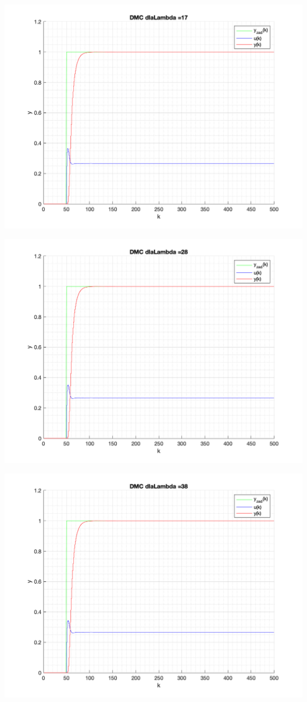 \documentclass[a4paper, 11pt]{article}
\begin{document}
\begin{enumerate}
 \includegraphics[width=\linewidth]{./ModelsP4_Lambda/P4_DMC_Lambda_17_png.png} 
 
 \includegraphics[width=\linewidth]{./ModelsP4_Lambda/P4_DMC_Lambda_28_png.png} 
 
 \includegraphics[width=\linewidth]{./ModelsP4_Lambda/P4_DMC_Lambda_38_png.png} 
 

\end{enumerate}
\end{document}
